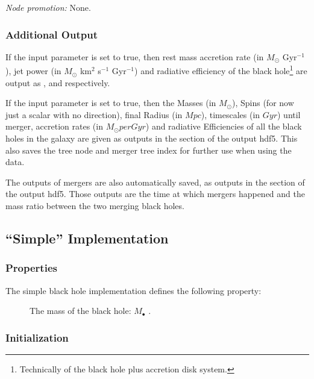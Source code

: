 \noindent\emph{Node promotion:} None.\\

\subsubsection{Additional Output}

If the \mono{[blackHoleOutputAccretion]} input parameter is set to true, then rest mass accretion rate (in $M_\odot$ Gyr$^{-1}$), jet power (in $M_\odot$ km$^2$ s$^{-1}$ Gyr$^{-1}$) and radiative efficiency of the black hole\footnote{Technically of the black hole plus accretion disk system.} are output as ,  and  respectively.

If the \mono{[blackHoleOutputData]} input parameter is set to true, then the Masses (in $M_\odot$), Spins (for now just a scalar with no direction), final Radius (in $Mpc$), timescales (in $Gyr$) until merger, accretion rates (in $M_\odot per Gyr$) and radiative Efficiencies of all the black holes in the galaxy are given as outputs in the  section of the output hdf5. This also saves the tree \gls{node} and merger tree index for further use when using the data.

The outputs of mergers are also automatically saved, as outputs in the  section of the output hdf5. Those outputs are the time at which mergers happened and the mass ratio between  the two merging black holes.


\subsection{``Simple'' Implementation}

\subsubsection{Properties}

The simple black hole implementation defines the following property:
\begin{description}
 \item [] The mass of the black hole: $M_\bullet$ \mono{[blackHoleMass]}.
\end{description}

\subsubsection{Initialization}

